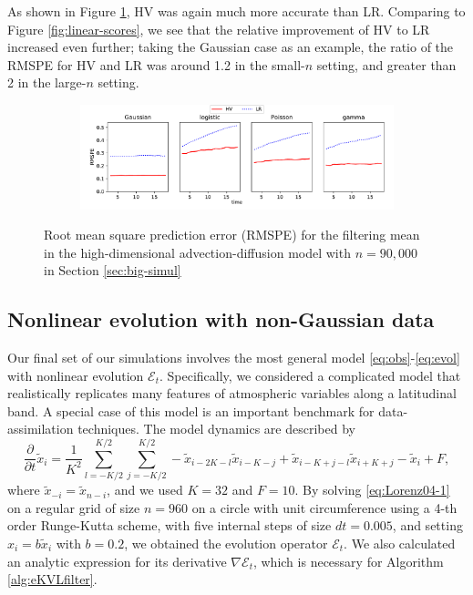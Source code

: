 \documentclass[12pt,letterpaper]{article}
\theoremstyle{propstyle}
\theoremstyle{propstyle}
\theoremstyle{propstyle}
\theoremstyle{propstyle}
\theoremstyle{propstyle}
\newcommand{\evol}{\mathcal{E}}
\begin{document}
As shown in Figure \ref{fig:linear-scores-big}, HV was again much more accurate than LR. Comparing to Figure \ref{fig:linear-scores}, we see that the relative improvement of HV to LR increased even further; taking the Gaussian case as an example, the ratio of the RMSPE for HV and LR was around 1.2 in the small-$n$ setting, and greater than 2 in the large-$n$ setting.

\begin{figure}[ht]
    \centering
    \begin{subfigure}{1.0\textwidth}
        \includegraphics[width=1.0\textwidth]{plots/linear-RMSPE.pdf}
    \end{subfigure}
    \caption{Root mean square prediction error (RMSPE) for the filtering mean in the high-dimensional advection-diffusion model with $n=90{,}000$ in Section \ref{sec:big-simul}}
    \label{fig:linear-scores-big}
\end{figure}


\subsection{Nonlinear evolution with non-Gaussian data\label{sec:lorenz}}


Our final set of our simulations involves the most general model \eqref{eq:obs}-\eqref{eq:evol} with nonlinear evolution $\evol_t$. Specifically, we considered a complicated model \citep[][Sect.~3]{Lorenz2005} that realistically replicates many features of atmospheric variables along a latitudinal band. A special case of this model \citep{Lorenz1996} is an important benchmark for data-assimilation techniques. %
The model dynamics are described by
\begin{equation}
\textstyle    \frac{\partial }{\partial t} \tilde x_i = \frac{1}{K^2} \sum_{l=-K/2}^{K/2}\sum_{j=-K/2}^{K/2} -\tilde x_{i-2K-l}\tilde x_{i-K-j} + \tilde x_{i-K+j-l}\tilde x_{i+K+j} - \tilde x_i + F,
    \label{eq:Lorenz04-1}
\end{equation}
where
$\tilde x_{-i} = \tilde x_{n-i}$, and we used $K=32$ and $F=10$.
By solving \eqref{eq:Lorenz04-1} on a regular grid of size $n=960$ on a circle with unit circumference using a 4-th order Runge-Kutta scheme, with five internal steps of size $dt=0.005$, and setting $x_i = b\tilde x_i$ with $b=0.2$, we obtained the evolution operator $\evol_t$. We also calculated an analytic expression for its derivative $\nabla\evol_t$, which is necessary for Algorithm \ref{alg:eKVLfilter}.
\end{document}
